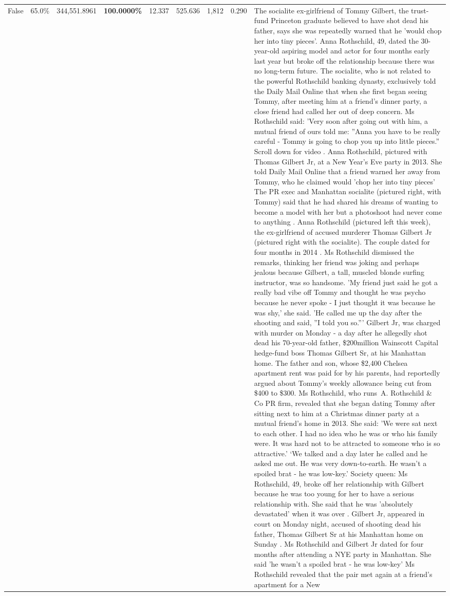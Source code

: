 \begin{table}[H]
\begin{tabular}{lllrlllll}
False & 65.0\% & 344,551.8961 & \bfseries \color{red} 100.0000\% & 12.337 & 525.636 & 1,812 & 0.290 & The socialite ex-girlfriend of Tommy Gilbert, the trust-fund Princeton graduate believed to have shot dead his father, says she was repeatedly warned that he 'would chop her into tiny pieces'. Anna Rothschild, 49, dated the 30-year-old aspiring model and actor for four months early last year but broke off the relationship because there was no long-term future. The socialite, who is not related to the powerful Rothschild banking dynasty, exclusively told the Daily Mail Online that when she first began seeing Tommy, after meeting him at a friend's dinner party, a close friend had called her out of deep concern. Ms Rothschild said: 'Very soon after going out with him, a mutual friend of ours told me: ''Anna you have to be really careful - Tommy is going to chop you up into little pieces.'' Scroll down for video . Anna Rothschild, pictured with Thomas Gilbert Jr, at a New Year's Eve party in 2013. She told Daily Mail Online that a friend warned her away from Tommy, who he claimed would 'chop her into tiny pieces' The PR exec and Manhattan socialite (pictured right, with Tommy) said that he had shared his dreams of wanting to become a model with her but a photoshoot had never come to anything . Anna Rothschild (pictured left this week), the ex-girlfriend of accused murderer Thomas Gilbert Jr (pictured right with the socialite). The couple dated for four months in 2014 . Ms Rothschild dismissed the remarks, thinking her friend was joking and perhaps jealous because Gilbert, a tall, muscled blonde surfing instructor, was so handsome. 'My friend just said he got a really bad vibe off Tommy and thought he was psycho because he never spoke - I just thought it was because he was shy,' she said. 'He called me up the day after the shooting and said, ''I told you so.''' Gilbert Jr, was charged with murder on Monday - a day after he allegedly shot dead his 70-year-old father, \$200million Wainscott Capital hedge-fund boss Thomas Gilbert Sr, at his Manhattan home. The father and son, whose \$2,400 Chelsea apartment rent was paid for by his parents, had reportedly argued about Tommy's weekly allowance being cut from \$400 to \$300. Ms Rothschild, who runs A. Rothschild \& Co PR firm, revealed that she began dating Tommy after sitting next to him at a Christmas dinner party at a mutual friend's home in 2013. She said: 'We were sat next to each other. I had no idea who he was or who his family were. It was hard not to be attracted to someone who is so attractive.' ‘We talked and a day later he called and he asked me out. He was very down-to-earth. He wasn’t a spoiled brat - he was low-key.’ Society queen: Ms Rothschild, 49, broke off her relationship with Gilbert because he was too young for her to have a serious relationship with. She said that he was 'absolutely devastated' when it was over . Gilbert Jr, appeared in court on Monday night, accused of shooting dead his father, Thomas Gilbert Sr at his Manhattan home on Sunday . Ms Rothschild and Gilbert Jr dated for four months after attending a NYE party in Manhattan. She said 'he wasn't a spoiled brat - he was low-key' Ms Rothschild revealed that the pair met again at a friend’s apartment for a New 
\end{tabular}
\end{table}

